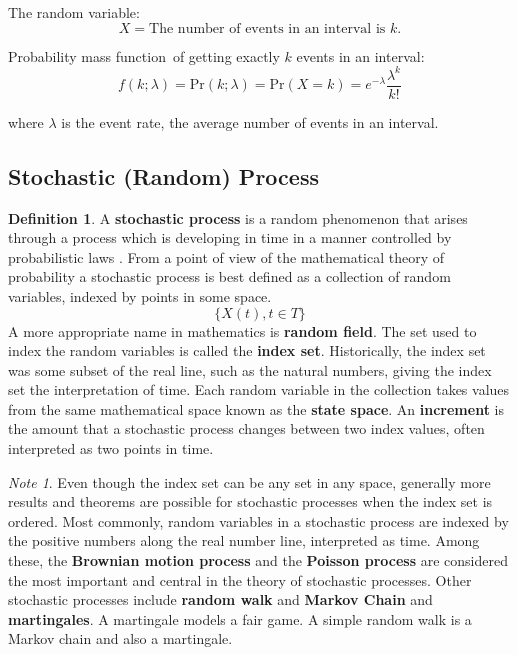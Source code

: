 \documentclass[12pt]{article}
\theoremstyle{plain}
\theoremstyle{definition}
\newtheorem{definition}{Definition}
\theoremstyle{remark}
\newtheorem*{note}{Note}
\begin{document}
The random variable:
\begin{equation*}
  X = \text{The number of events in an interval is $k$.}
\end{equation*}

Probability mass function\footnotemark\ of getting exactly $k$ events in an
interval:
\begin{equation*}
  f(k;\lambda) = \mathrm{Pr}(k;\lambda) = \mathrm{Pr}(X=k) =
  e^{-\lambda}\frac{\lambda^k}{k!}
\end{equation*}

where $\lambda$ is the event rate, the average number of events in an interval.

\subsection{Stochastic (Random) Process}

\begin{definition}
  A \textbf{stochastic process} is a random phenomenon that arises through a
  process which is developing in time in a manner controlled by probabilistic
  laws \citep{par99}.
  From a point of view of the mathematical theory of probability a stochastic
  process is best defined as a collection of random variables, indexed by points
  in some space.
  \begin{equation*}
    \{X(t), t \in T\}
  \end{equation*}
  A more appropriate name in mathematics is \textbf{random field}.
  The set used to index the random variables is called the \textbf{index set}.
  Historically, the index set was some subset of the real line, such as the
  natural numbers, giving the index set the interpretation of time.
  Each random variable in the collection takes values from the same mathematical
  space known as the \textbf{state space}.
  An \textbf{increment} is the amount that a stochastic process changes between
  two index values, often interpreted as two points in time.
\end{definition}

\begin{note}
  Even though the index set can be any set in any space, generally more results
  and theorems are possible  for stochastic processes when the index set is
  ordered.
  Most commonly, random variables in a stochastic process are indexed by the
  positive numbers along the real number line, interpreted as time.
  Among these, the \textbf{Brownian motion process} and
  the \textbf{Poisson process} are considered the most important and central in
  the theory of stochastic processes.
  Other stochastic processes include \textbf{random walk} and
  \textbf{Markov Chain} and \textbf{martingales}.
  A martingale models a fair game.
  A simple random walk is a Markov chain and also a martingale.
\end{note}
\end{document}
